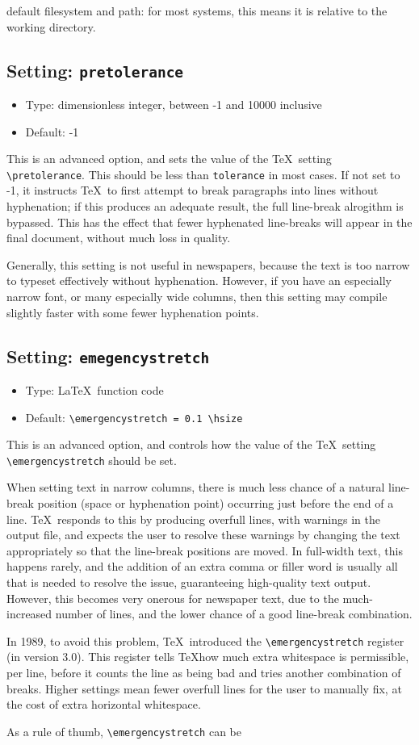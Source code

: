 \documentclass[a4paper,DIV=11]{scrartcl}
\newcommand{\property}[5]{
  \subsection{#1: \texttt{#2}}
  \begin{itemize}
  \item Type: #3
  \item Default: #4
  \end{itemize}
  #5
}
\newcommand{\setting}{\property{Setting}}
\begin{document}
\begin{multicols}{2}
{  default filesystem and path: for most systems, this means it is
  relative to the working directory.}
\setting{pretolerance}{dimensionless integer, between -1 and 10000 inclusive}{-1}{
  This is an advanced option, and sets the value of the \TeX\ setting
  \texttt{\textbackslash pretolerance}. This should be less than
  \texttt{tolerance} in most cases. If not set to -1, it instructs
  \TeX\ to first attempt to break paragraphs into lines without
  hyphenation; if this produces an adequate result, the full
  line-break alrogithm is bypassed. This has the effect that fewer
  hyphenated line-breaks will appear in the final document, without
  much loss in quality.\par
  Generally, this setting is not useful in newspapers, because the
  text is too narrow to typeset effectively without
  hyphenation. However, if you have an especially narrow font, or many
  especially wide columns, then this setting may compile slightly
  faster with some fewer hyphenation points.
}
\setting{emegencystretch}{\LaTeX\ function code}{\texttt{\textbackslash emergencystretch = 0.1 \textbackslash hsize}}{
  This is an advanced option, and controls how the value of the \TeX\ setting
  \texttt{\textbackslash emergencystretch} should be set.\par
  When setting text in narrow columns, there is much less chance of a
  natural line-break position (space or hyphenation point) occurring
  just before the end of a line. \TeX\ responds to this by producing
  overfull lines, with warnings in the output file, and expects the
  user to resolve these warnings by changing the text appropriately so
  that the line-break positions are moved. In full-width text, this
  happens rarely, and the addition of an extra comma or filler word is
  usually all that is needed to resolve the issue, guaranteeing
  high-quality text output. However, this
  becomes very onerous for newspaper text, due to the much-increased
  number of lines, and the lower chance of a good line-break
  combination.\par
  In 1989, to avoid this problem, \TeX\ introduced the
  \texttt{\textbackslash emergencystretch}
  register (in version 3.0). This register tells \TeX how much extra
  whitespace is permissible, per line, before it counts the line as
  being bad and tries another combination of breaks. Higher settings
  mean fewer overfull lines for the user to manually fix, at the cost
  of extra horizontal whitespace.\par
  As a rule of thumb, \texttt{\textbackslash emergencystretch} can be
}
\end{multicols}
\end{document}
